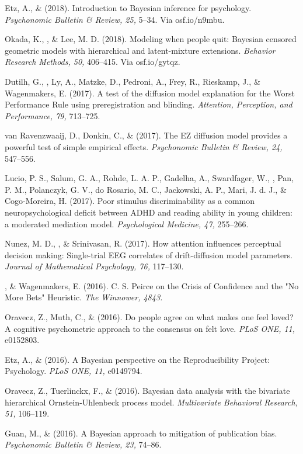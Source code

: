 \item[44.] Etz, A., \& \vdkh{} (2018). Introduction to Bayesian inference for psychology. {\em Psychonomic Bulletin \& Review, 25,} 5--34. Via osf.io/n9mbu.
\item[43.] Okada, K., \vdkh{}, \& Lee, M. D. (2018). Modeling when people quit: Bayesian censored geometric models with hierarchical and latent-mixture extensions. {\em Behavior Research Methods, 50,} 406--415. Via osf.io/gytqz.
\item[42.] Dutilh, G., \vdkh{}, Ly, A., Matzke, D., Pedroni, A., Frey, R., Rieskamp, J., \& Wagenmakers, E. (2017). A test of the diffusion model explanation for the Worst Performance Rule using preregistration and blinding. {\em Attention, Perception, and Performance, 79,} 713--725.
\item[41.] van Ravenzwaaij, D., Donkin, C., \& \vdkh{} (2017). The EZ diffusion model provides a powerful test of simple empirical effects. {\em Psychonomic Bulletin \& Review, 24,} 547--556.
\item[40.] Lucio, P. S., Salum, G. A., Rohde, L. A. P., Gadelha, A., Swardfager, W., \vdkh{}, Pan, P. M., Polanczyk, G. V., do Rosario, M. C., Jackowski, A. P., Mari, J. d. J., \& Cogo-Moreira, H. (2017). Poor stimulus discriminability as a common neuropsychological deficit between ADHD and reading ability in young children: a  moderated mediation model. {\em Psychological Medicine, 47,} 255--266.
\item[39.] Nunez, M. D., \vdkh{}, \& Srinivasan, R. (2017). How attention influences perceptual decision making: Single-trial EEG correlates of drift-diffusion model parameters. {\em Journal of Mathematical Psychology, 76,} 117--130.
\item[38.] \vdkh{}, \& Wagenmakers, E. (2016). C. S. Peirce on the Crisis of Confidence and the "No More Bets" Heuristic. {\em The Winnower, 4843.}
\item[37.] Oravecz, Z., Muth, C., \& \vdkh{} (2016). Do people agree on what makes one feel loved? A cognitive psychometric approach to the consensus on felt love. {\em PLoS ONE, 11,} e0152803.
\item[36.] Etz, A., \& \vdkh{} (2016). A Bayesian perspective on the Reproducibility Project: Psychology. {\em PLoS ONE, 11,} e0149794.
\item[35.] Oravecz, Z., Tuerlinckx, F., \& \vdkh{} (2016). Bayesian data analysis with the bivariate hierarchical Ornstein-Uhlenbeck process model. {\em Multivariate Behavioral Research, 51,} 106--119.
\item[34.] Guan, M., \& \vdkh{} (2016). A Bayesian approach to mitigation of publication bias. {\em Psychonomic Bulletin \& Review, 23,} 74--86.
